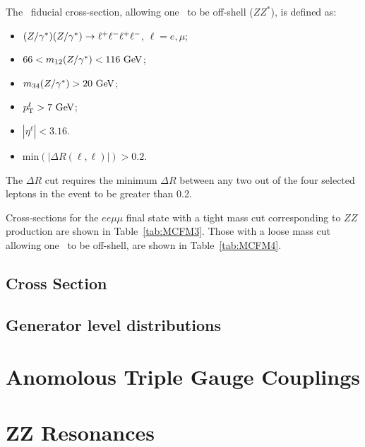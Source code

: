 The \zzllll\ fiducial cross-section, allowing one \Z\ to be off-shell ($ZZ^*$), is defined as:

\begin{itemize}
\item $(Z/\gamma^*)(Z/\gamma^*)\rightarrow\ell^+ \ell^-\ell^+ \ell^-$, $\ell = e,\mu$;
\item $66 < m_{12}(\Z/\gamma^*) <  116\GeV$;
\item $m_{34}(\Z/\gamma^*) > 20\GeV$;
\item $\pT^{\ell} > 7\GeV$;
\item $|\eta^{\ell}| < 3.16$.
\item $\mathrm{min}(|\Delta R(\ell,\ell)|) > 0.2$.
\end{itemize}

The $\Delta R$ cut requires the minimum $\Delta R$ between any two out of the
four selected leptons in the event to be greater than 0.2.

Cross-sections for the $ee\mu\mu$ final state with a tight mass cut corresponding to $ZZ$ production are  shown in Table~\ref{tab:MCFM3}.
Those with a loose mass cut allowing one \Z\ to be off-shell, are shown in Table~\ref{tab:MCFM4}.  
\subsection{Cross Section}
\subsection{Generator level distributions}
\section{Anomolous Triple Gauge Couplings}
\section{ZZ Resonances}
